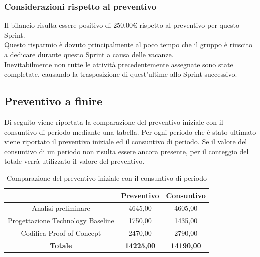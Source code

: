 \subsubsection{Considerazioni rispetto al preventivo} \label{subsubsection:considerazioni_finali_sprint3}
Il bilancio risulta essere positivo di 250,00€ rispetto al preventivo per questo Sprint\glo{}.
\\Questo risparmio è dovuto principalmente al poco tempo che il gruppo è riuscito a dedicare durante questo Sprint\glo{} a causa delle vacanze.
\\Inevitabilmente non tutte le attività precedentemente assegnate sono state completate, causando la trasposizione di quest'ultime allo Sprint\glo{} successivo.


\subsection{Preventivo a finire} \label{subsection:preventivo_a_finire}
Di seguito viene riportata la comparazione del preventivo iniziale con il consuntivo di periodo mediante una tabella.
Per ogni periodo che è stato ultimato viene riportato il preventivo iniziale ed il consuntivo di periodo.
Se il valore del consuntivo di un periodo non risulta essere ancora presente, per il conteggio del totale verrà utilizzato il valore del preventivo.
\begin{table}[H]
  \centering
  \renewcommand{\arraystretch}{1.8}
  \begin{tabular}{c|c|c}
    \rowcolor[HTML]{125E28}
    \multicolumn{1}{c}{\color[HTML]{FFFFFF}\textbf{Periodo}}
                                      & \multicolumn{1}{c}{\color[HTML]{FFFFFF}\textbf{Preventivo}}
                                      & \multicolumn{1}{c}{\color[HTML]{FFFFFF}\textbf{Consuntivo}}                     \\
    \hline
    Analisi preliminare               & 4645,00                                                     & 4605,00           \\
    Progettazione Technology Baseline & 1750,00                                                     & 1435,00           \\
    Codifica Proof of Concept         & 2470,00                                                     & 2790,00           \\
    \textbf{Totale}                   & \textbf{14225,00}                                           & \textbf{14190,00} \\
  \end{tabular}
  \caption{Comparazione del preventivo iniziale con il consuntivo di periodo}
\end{table}

